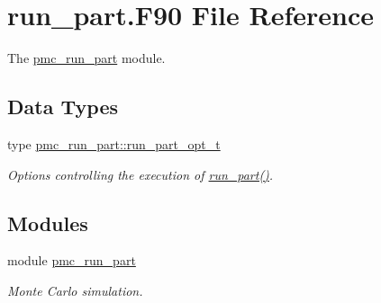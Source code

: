 \hypertarget{run__part_8_f90}{}\section{run\+\_\+part.\+F90 File Reference}
\label{run__part_8_f90}


The \mbox{\hyperlink{namespacepmc__run__part}{pmc\+\_\+run\+\_\+part}} module.  


\subsection*{Data Types}
\begin{DoxyCompactItemize}
\item 
type \mbox{\hyperlink{structpmc__run__part_1_1run__part__opt__t}{pmc\+\_\+run\+\_\+part\+::run\+\_\+part\+\_\+opt\+\_\+t}}
\begin{DoxyCompactList}\small\item\em Options controlling the execution of \mbox{\hyperlink{namespacepmc__run__part_af2f5c765b1f86663d85b7ca882325eca}{run\+\_\+part()}}. \end{DoxyCompactList}\end{DoxyCompactItemize}
\subsection*{Modules}
\begin{DoxyCompactItemize}
\item 
module \mbox{\hyperlink{namespacepmc__run__part}{pmc\+\_\+run\+\_\+part}}
\begin{DoxyCompactList}\small\item\em Monte Carlo simulation. \end{DoxyCompactList}\end{DoxyCompactItemize}
